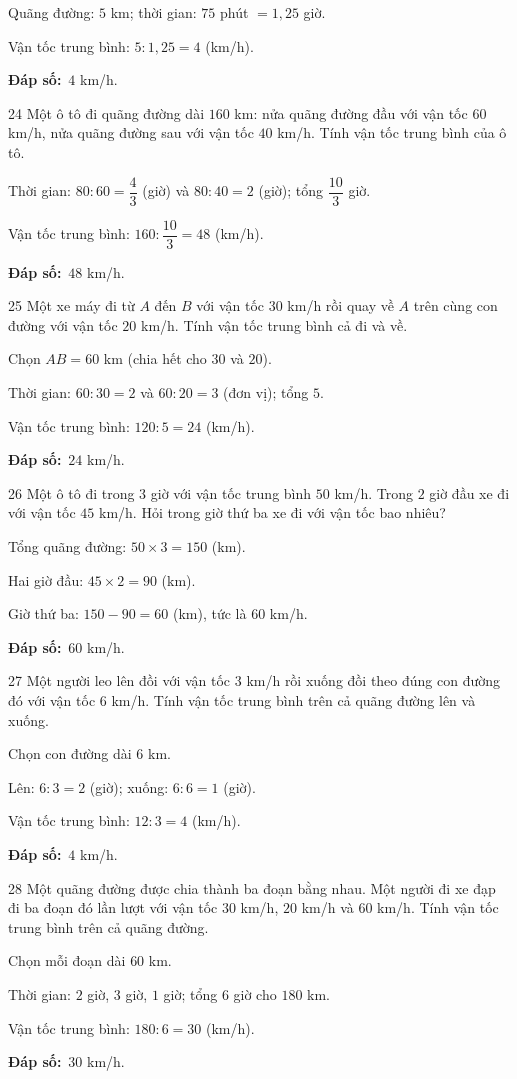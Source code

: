 \documentclass[11pt]{article}
\newif\ifsol \solfalse
\providecommand{\AnsWord}{Đáp số}
\newcommand{\dapso}[1]{\par\textbf{\AnsWord:}\ #1}
\newcommand{\probsol}[1]{%
  \begin{lrbox}{\solmeasure}\begin{minipage}{\dimexpr\linewidth-24pt\relax}#1\end{minipage}\end{lrbox}%
  \ifsol
    \begin{solbox}#1\end{solbox}%
  \else
    \setlength{\solht}{\dimexpr\ht\solmeasure+\dp\solmeasure+0.85cm\relax}%
    \ifdim\solht<1.35cm\setlength{\solht}{1.35cm}\fi
    \begin{tcolorbox}[colback=white,colframe=Line,boxrule=0.8pt,arc=5pt,
      left=8pt,right=8pt,top=4pt,bottom=4pt,height=\solht]{\footnotesize\color{Slate}\itshape\WorkWord}\end{tcolorbox}%
  \fi}
\newcommand{\gap}{\vspace{0.3cm}}
\def\WorkWord{Bài làm:}
\def\AnsWord{Đáp số}
\begin{document}
\probsol{
Quãng đường: $5$ km; thời gian: $75$ phút $=1{,}25$ giờ.\par Vận tốc trung bình: $5:1{,}25=4$ (km/h).
\dapso{$4$ km/h.}}
\gap
\begin{probbox}{24}{\relax}
Một ô tô đi quãng đường dài $160$ km: nửa quãng đường đầu với vận tốc $60$ km/h, nửa quãng đường sau với vận tốc $40$ km/h. Tính vận tốc trung bình của ô tô.
\end{probbox}
\probsol{
Thời gian: $80:60=\dfrac43$ (giờ) và $80:40=2$ (giờ); tổng $\dfrac{10}3$ giờ.\par Vận tốc trung bình: $160:\dfrac{10}3=48$ (km/h).
\dapso{$48$ km/h.}}
\gap
\begin{probbox}{25}{\relax}
Một xe máy đi từ $A$ đến $B$ với vận tốc $30$ km/h rồi quay về $A$ trên cùng con đường với vận tốc $20$ km/h. Tính vận tốc trung bình cả đi và về.
\end{probbox}
\probsol{
Chọn $AB=60$ km (chia hết cho $30$ và $20$).\par Thời gian: $60:30=2$ và $60:20=3$ (đơn vị); tổng $5$.\par
Vận tốc trung bình: $120:5=24$ (km/h).
\dapso{$24$ km/h.}}
\gap
\begin{probbox}{26}{\relax}
Một ô tô đi trong $3$ giờ với vận tốc trung bình $50$ km/h. Trong $2$ giờ đầu xe đi với vận tốc $45$ km/h. Hỏi trong giờ thứ ba xe đi với vận tốc bao nhiêu?
\end{probbox}
\probsol{
Tổng quãng đường: $50\times3=150$ (km).\par Hai giờ đầu: $45\times2=90$ (km).\par Giờ thứ ba: $150-90=60$ (km), tức là $60$ km/h.
\dapso{$60$ km/h.}}
\gap
\begin{probbox}{27}{\relax}
Một người leo lên đồi với vận tốc $3$ km/h rồi xuống đồi theo đúng con đường đó với vận tốc $6$ km/h. Tính vận tốc trung bình trên cả quãng đường lên và xuống.
\end{probbox}
\probsol{
Chọn con đường dài $6$ km.\par Lên: $6:3=2$ (giờ); xuống: $6:6=1$ (giờ).\par Vận tốc trung bình: $12:3=4$ (km/h).
\dapso{$4$ km/h.}}
\gap
\begin{probbox}{28}{\relax}
Một quãng đường được chia thành ba đoạn bằng nhau. Một người đi xe đạp đi ba đoạn đó lần lượt với vận tốc $30$ km/h, $20$ km/h và $60$ km/h. Tính vận tốc trung bình trên cả quãng đường.
\end{probbox}
\probsol{
Chọn mỗi đoạn dài $60$ km.\par Thời gian: $2$ giờ, $3$ giờ, $1$ giờ; tổng $6$ giờ cho $180$ km.\par Vận tốc trung bình: $180:6=30$ (km/h).
\dapso{$30$ km/h.}}
\end{document}
